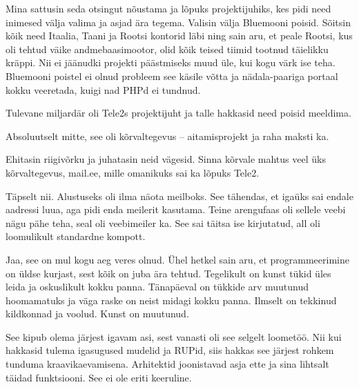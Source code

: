 Mina sattusin seda otsingut nõustama ja lõpuks projektijuhiks, kes 
pidi need inimesed välja valima ja asjad ära tegema. Valisin välja 
Bluemooni poisid. Sõitsin kõik need Itaalia, 
Taani ja Rootsi kontorid läbi ning sain aru, et peale Rootsi, kus oli tehtud väike 
andmebaasimootor, olid kõik teised tiimid tootnud täielikku kräppi. Nii ei 
jäänudki projekti päästmiseks muud üle, kui kogu värk ise teha. Bluemooni
poistel ei olnud probleem see käsile võtta ja nädala-paariga 
portaal kokku veeretada, kuigi nad PHPd ei tundnud.

Tulevane miljardär oli Tele2s projektijuht ja talle 
hakkasid need poisid meeldima. 


Absoluutselt mitte, see oli kõrvaltegevus – aitamisprojekt ja raha 
maksti ka.


Ehitasin riigivõrku ja juhatasin neid 
vägesid. Sinna kõrvale mahtus veel üks kõrvaltegevus, 
mail.ee, mille omanikuks sai ka lõpuks Tele2. 


Täpselt nii. Alustuseks oli ilma näota 
meilboks. See tähendas, et igaüks sai endale aadressi luua, aga pidi enda 
meilerit kasutama. Teine arengufaas oli sellele veebi nägu pähe teha, seal oli veebimeiler ka. See sai täitsa ise kirjutatud, all 
oli loomulikult standardne kompott. 


Jaa, see on mul kogu aeg veres olnud. Ühel hetkel sain aru, et 
programmeerimine on üldse kurjast, sest kõik on juba ära tehtud. 
Tegelikult on kunst tükid üles leida ja oskuslikult kokku panna. 
Tänapäeval on tükkide arv muutunud hoomamatuks ja väga raske on neist midagi kokku panna. Ilmselt on 
tekkinud kildkonnad ja voolud. Kunst on muutunud.


See kipub olema järjest igavam asi, sest vanasti oli 
see selgelt loometöö. Nii kui hakkasid tulema igasugused 
mudelid ja RUPid, siis hakkas see
järjest rohkem tunduma kraavikaevamisena. Arhitektid joonistavad asja ette ja sina lihtsalt täidad 
funktsiooni. See ei ole eriti keeruline. 


